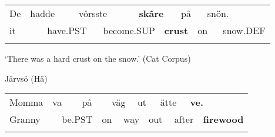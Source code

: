 \begin{tabular}{llllllllllll}
\lsptoprule
De & \multicolumn{2}{l}{hadde

} & \multicolumn{2}{l}{vôrsste

} & \multicolumn{2}{l}{{\bfseries skâre}

} & \multicolumn{2}{l}{på

} & \multicolumn{2}{l}{snön.

} & \\
\multicolumn{2}{l}{it

} & \multicolumn{2}{l}{have.PST

} & \multicolumn{2}{l}{become.SUP

} & \multicolumn{2}{l}{{\bfseries crust}

} & \multicolumn{2}{l}{on

} & \multicolumn{2}{l}{snow.DEF

}\\
\lspbottomrule
\end{tabular}

\begin{styleTranslation}
‘There was a hard crust on the snow.’ (Cat Corpus)

\end{styleTranslation}

\begin{listWWNumileveli}
\item {}

\begin{styleExample}
Järvsö (Hä)

\end{styleExample}

\end{listWWNumileveli}

\begin{tabular}{llllllllllllll}
\lsptoprule
Momma & \multicolumn{2}{l}{va

} & \multicolumn{2}{l}{på

} & \multicolumn{2}{l}{väg

} & \multicolumn{2}{l}{ut

} & \multicolumn{2}{l}{ätte

} & \multicolumn{2}{l}{{\bfseries ve.}

} & \\
\multicolumn{2}{l}{Granny

} & \multicolumn{2}{l}{be.PST

} & \multicolumn{2}{l}{on

} & \multicolumn{2}{l}{way

} & \multicolumn{2}{l}{out

} & \multicolumn{2}{l}{after

} & \multicolumn{2}{l}{{\bfseries firewood}

}\\
\lspbottomrule
\end{tabular}

